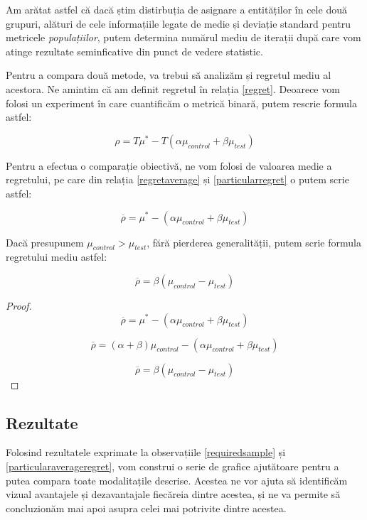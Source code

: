 Am arătat astfel că dacă știm distirbuția de asignare a entităților în cele două grupuri, alături de cele informațiile legate de medie și deviație standard pentru metricele \textit{populațiilor}, putem determina numărul mediu de iterații după care vom atinge rezultate seminficative din punct de vedere statistic.

Pentru a compara două metode, va trebui să analizăm și regretul mediu al acestora. Ne amintim că am definit regretul în relația \ref{regret}. Deoarece vom folosi un experiment în care cuantificăm o metrică binară, putem rescrie formula astfel:

\begin{equation}
\label{particularregret}
	\rho = T \mu^* - T(\alpha \mu_{control}  +  \beta \mu_{test})
\end{equation}

Pentru a efectua o comparație obiectivă, ne vom folosi de valoarea medie a regretului, pe care din relația \ref{regretaverage} și \ref{particularregret} o putem scrie astfel: 

\begin{equation}
\label{particularregretaverage}
	\overline{\rho} = \mu^* - (\alpha \mu_{control}  +  \beta  \mu_{test})
\end{equation}

\begin{remark}
\label{particularaverageregret}
	Dacă presupunem $\mu_{control} > \mu_{test}$, fără pierderea generalității, putem scrie formula regretului mediu astfel:
	
	\[
		\overline{\rho} = \beta (\mu_{control} - \mu_{test})
	\]
\end{remark}

\begin{proof}
	
	\[
		\overline{\rho} = \mu^* - (\alpha \mu_{control}  +  \beta  \mu_{test})
	\]
	
	\[
	\overline{\rho} = (\alpha + \beta)\mu_{control} - (\alpha \mu_{control}  +  \beta  \mu_{test})
	\]
	
	\[
	\overline{\rho} = \beta (\mu_{control} - \mu_{test})
	\]
\end{proof}

\subsection{Rezultate}

Folosind rezultatele exprimate la observațiile \ref{requiredsample}  și \ref{particularaverageregret}, vom construi o serie de grafice ajutătoare pentru a putea compara toate modalitațile descrise. Acestea ne vor ajuta să identificăm vizual avantajele și dezavantajale fiecăreia dintre acestea, și ne va permite să concluzionăm mai apoi asupra celei mai potrivite dintre acestea.

